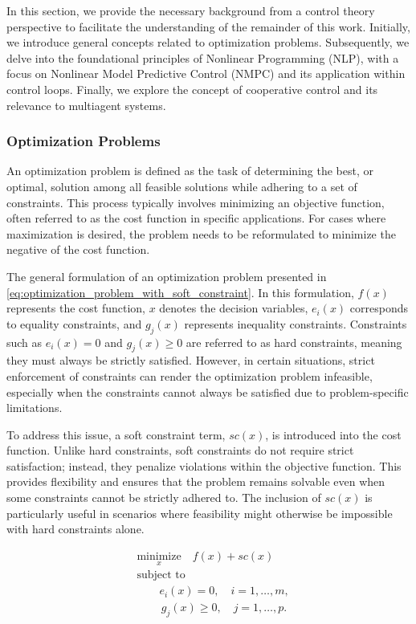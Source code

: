 In this section, we provide the necessary background from a control theory perspective to facilitate the understanding of the remainder of this work. Initially, we introduce general concepts related to optimization problems. Subsequently, we delve into the foundational principles of Nonlinear Programming (NLP), with a focus on Nonlinear Model Predictive Control (NMPC) and its application within control loops. Finally, we explore the concept of cooperative control and its relevance to multiagent systems.

\subsubsection{Optimization Problems}

An optimization problem is defined as the task of determining the best, or optimal, solution among all feasible solutions while adhering to a set of constraints. This process typically involves minimizing an objective function, often referred to as the cost function in specific applications. For cases where maximization is desired, the problem needs to be reformulated to minimize the negative of the cost function.

The general formulation of an optimization problem presented in \ref{eq:optimization_problem_with_soft_constraint}. In this formulation, \( f(x) \) represents the cost function, \( x \) denotes the decision variables, \( e_i(x) \) corresponds to equality constraints, and \( g_j(x) \) represents inequality constraints. Constraints such as \( e_i(x) = 0 \) and \( g_j(x) \geq 0 \) are referred to as hard constraints, meaning they must always be strictly satisfied. However, in certain situations, strict enforcement of constraints can render the optimization problem infeasible, especially when the constraints cannot always be satisfied due to problem-specific limitations.

To address this issue, a soft constraint term, \( sc(x) \), is introduced into the cost function. Unlike hard constraints, soft constraints do not require strict satisfaction; instead, they penalize violations within the objective function. This provides flexibility and ensures that the problem remains solvable even when some constraints cannot be strictly adhered to. The inclusion of \( sc(x) \) is particularly useful in scenarios where feasibility might otherwise be impossible with hard constraints alone.

\begin{equation}
    \begin{aligned}
        &\underset{x}{\text{minimize}} \quad f(x) + sc(x) \\
        &\text{subject to}\\
        &\quad \quad e_i(x) = 0, \quad i = 1, \dots, m, \\
        &\quad \quad \, g_j(x) \geq 0, \quad j = 1, \dots, p.
    \end{aligned}
    \label{eq:optimization_problem_with_soft_constraint}
\end{equation}


